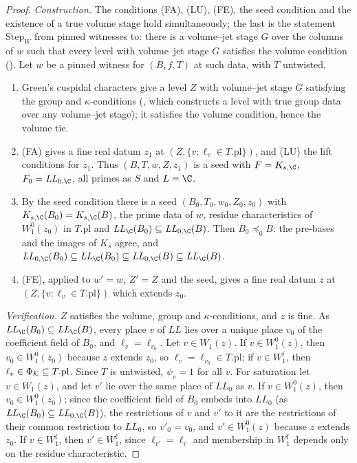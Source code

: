 \begin{proof}
\emph{Construction.} The conditions (FA), (LU), (FE), the seed condition and the existence of a true volume stage hold simultaneously; the
last is the statement $\mathrm{Step}_W$ from pinned witnesses to: there is a volume--jet stage $G$ over the columns of $w$ such that every
level with volume--jet stage $G$ satisfies the volume condition ().
Let $w$ be a pinned witness for $(B,f,T)$ at such data, with $T$ untwisted.
\begin{enumerate}[label=(\arabic*)]
\item Green's cuspidal characters give a level $Z$ with volume--jet stage $G$ satisfying the group and $\kappa$-conditions
(, which constructs a level with true group data over any volume--jet stage); it
satisfies the volume condition, hence the volume tie.
\item (FA) gives a fine real datum $z_1$ at $(Z,\{v:\ell_v\in T.\mathrm{pl}\})$, and (LU) the lift conditions for $z_1$. Thus $(B,T,w,Z,z_1)$
is a seed with $F=K_{s,\C}$, $F_0=\mathit{LL}_{0,\C}$, all primes as $S$ and $L=\C$.
\item By the seed condition there is a seed $(B_0,T_0,w_0,Z_0,z_0)$ with $K_{s,\C}(B_0)=K_{s,\C}(B)$, the prime data of $w$, residue
characteristics of $W_1^0(z_0)$ in $T.\mathrm{pl}$ and $\mathit{LL}_\C(B_0)\subseteq\mathit{LL}_{0,\C}(B)$. Then $B_0\preceq_0B$: the pre-bases
and the images of $K_s$ agree, and $\mathit{LL}_{0,\C}(B_0)\subseteq\mathit{LL}_\C(B_0)\subseteq\mathit{LL}_{0,\C}(B)\subseteq\mathit{LL}_\C(B)$.
\item (FE), applied to $w'=w$, $Z'=Z$ and the seed, gives a fine real datum $z$ at $(Z,\{v:\ell_v\in T.\mathrm{pl}\})$ which extends $z_0$.
\end{enumerate}

\emph{Verification.} $Z$ satisfies the volume, group and $\kappa$-conditions, and $z$ is fine. As $\mathit{LL}_\C(B_0)\subseteq\mathit{LL}_\C(B)$,
every place $v$ of $\mathit{LL}$ lies over a unique place $v_0$ of the coefficient field of $B_0$, and $\ell_v=\ell_{v_0}$. Let $v\in W_1(z)$.
If $v\in W_1^0(z)$, then $v_0\in W_1^0(z_0)$ because $z$ extends $z_0$, so $\ell_v=\ell_{v_0}\in T.\mathrm{pl}$; if $v\in W_1^{\mathrm f}$, then
$\ell_v\in\Phi_\mathcal K\subseteq T.\mathrm{pl}$. Since $T$ is untwisted, $\psi_v=1$ for all $v$. For saturation let $v\in W_1(z)$, and let $v'$ lie
over the same place of $\mathit{LL}_0$ as $v$. If $v\in W_1^0(z)$, then $v_0\in W_1^0(z_0)$; since the coefficient field of $B_0$ embeds into
$\mathit{LL}_0$ (as $\mathit{LL}_\C(B_0)\subseteq\mathit{LL}_{0,\C}(B)$), the restrictions of $v$ and $v'$ to it are the restrictions of their
common restriction to $\mathit{LL}_0$, so $v'_0=v_0$, and $v'\in W_1^0(z)$ because $z$ extends $z_0$. If $v\in W_1^{\mathrm f}$, then
$v'\in W_1^{\mathrm f}$, since $\ell_{v'}=\ell_v$ and membership in $W_1^{\mathrm f}$ depends only on the residue characteristic.
\end{proof}

